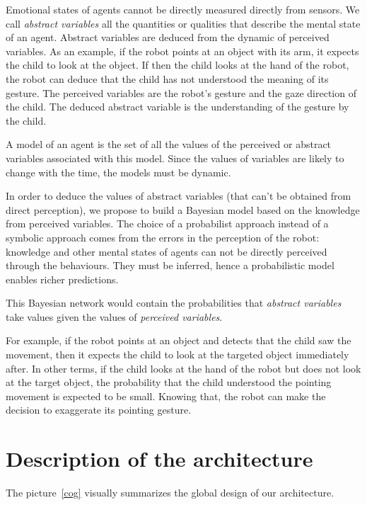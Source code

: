 \documentclass[conference]{IEEEtran}
\begin{document}
Emotional states of agents cannot be directly measured directly from sensors. 
We call \textit{abstract variables} all the quantities or qualities that describe the mental state of an agent. 
Abstract variables are deduced from the dynamic of perceived variables. 
As an example, if the robot points at an object with its arm, it expects the child to look at the object. 
If then the child looks at the hand of the robot, the robot can deduce that the child has not understood the meaning of its gesture. 
The perceived variables are the robot's gesture and the gaze direction of the child. 
The deduced abstract variable is the understanding of the gesture by the child. 

A model of an agent is the set of all the values of the perceived or abstract variables associated with this model. 
Since the values of variables are likely to change with the time, the models must be dynamic.


In order to deduce the values of abstract variables (that can't be obtained from direct perception), we propose to build a Bayesian model based on the knowledge from perceived variables. 
The choice of a probabilist approach instead of a symbolic approach comes from the errors in the perception of the robot: knowledge and other mental states of agents can not be directly perceived through the behaviours. 
They must be inferred, hence a probabilistic model enables richer predictions.

This Bayesian network would contain the probabilities that \emph{abstract variables} take values given the values of \emph{perceived variables}. 

For example, if the robot points at an object and detects that the child saw the movement, then it expects the child to look at the targeted object immediately after.
In other terms, if the child looks at the hand of the robot but does not look at the target object, the probability that the child understood the pointing movement is expected to be small.
Knowing that, the robot can make the decision to exaggerate its pointing gesture. 


\section{Description of the architecture}
The picture~\ref{cog} visually summarizes the global design of our architecture. 
\end{document}
